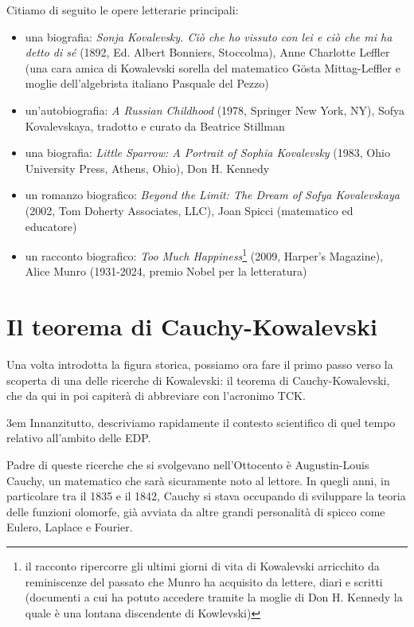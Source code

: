 Citiamo di seguito le opere letterarie principali:
\begin{itemize}

\item una biografia: \textit{Sonja Kovalevsky. Ciò che ho vissuto con lei e ciò che mi ha detto di sé} (1892, Ed. Albert
Bonniers, Stoccolma), Anne Charlotte Leffler (una cara amica di Kowalevski sorella del matematico Gösta Mittag-Leffler e moglie dell'algebrista italiano Pasquale del Pezzo)

\item un'autobiografia: \textit{A Russian Childhood} (1978, Springer New York, NY), Sofya Kovalevskaya, tradotto e curato da Beatrice Stillman

\item una biografia: \textit{Little Sparrow: A Portrait of Sophia Kovalevsky} (1983,
Ohio University Press, Athens, Ohio), Don H. Kennedy

\item un romanzo biografico: \textit{Beyond the Limit: The Dream of Sofya Kovalevskaya} (2002, Tom
Doherty Associates, LLC), Joan Spicci (matematico ed educatore)

\item un racconto biografico: \textit{Too Much Happiness}\footnote{ il racconto ripercorre gli ultimi giorni di vita di Kowalevski arricchito da reminiscenze del passato
che Munro ha acquisito da lettere, diari e scritti (documenti a cui ha potuto
accedere tramite la moglie di Don H. Kennedy la quale è una lontana discendente di Kowlevski)} 
(2009, Harper's Magazine), Alice Munro (1931-2024, premio Nobel per la letteratura)

\end{itemize}

\section{Il teorema di Cauchy-Kowalevski}\label{introck}

Una volta introdotta la figura storica, possiamo ora fare il primo passo verso la scoperta di una delle ricerche di Kowalevski: il teorema di Cauchy-Kowalevski, che da qui in poi capiterà di abbreviare con l'acronimo TCK.

\emergencystretch 3em
Innanzitutto, descriviamo rapidamente il contesto scientifico di quel tempo relativo all'ambito delle EDP. 

Padre di queste ricerche che si svolgevano nell'Ottocento è Augustin-Louis Cauchy, un matematico che sarà sicuramente noto al lettore. In quegli anni, in particolare tra il 1835 e il 1842, Cauchy si stava occupando di sviluppare la teoria delle funzioni olomorfe, già avviata da altre grandi personalità di spicco come Eulero, Laplace e Fourier.

